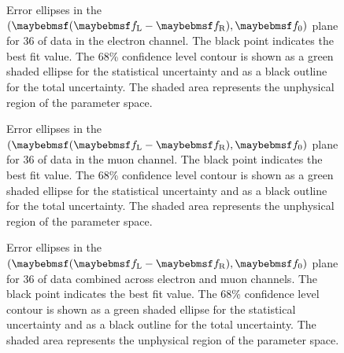 \begin{figure}[h!]
\centering
{}\quad
{}
\caption[Error ellipses in the $(\fLmfR, \f0)$ plane for \unit{36}{\invpb} of
data in the electron channel]{Error ellipses in the $(\fLmfR, \f0)$ plane for
  \unit{36}{\invpb} of data in the electron channel. The black point indicates
  the best fit value. The 68\% confidence level contour is shown as a green
  shaded ellipse for the statistical uncertainty and as a black outline for the
  total uncertainty. The shaded area represents the unphysical region of the
  parameter space.}
\label{fig:wpol_contour_ele}
\end{figure}

\begin{figure}[h!]
\centering
{}\quad
{}
\caption[Error ellipses in the $(\fLmfR, \f0)$ plane for \unit{36}{\invpb} of
data in the muon channel]{Error ellipses in the $(\fLmfR, \f0)$ plane for
  \unit{36}{\invpb} of data in the muon channel. The black point indicates the
  best fit value. The 68\% confidence level contour is shown as a green shaded
  ellipse for the statistical uncertainty and as a black outline for the total
  uncertainty. The shaded area represents the unphysical region of the parameter
  space.}
\label{fig:wpol_contour_mu}
\end{figure}


\begin{figure}[h!]
\centering
{}\quad
{}
\caption[Error ellipses in the $(\fLmfR, \f0)$ plane for \unit{36}{\invpb} of
data combined across electron and muon channels]{Error ellipses in the $(\fLmfR,
  \f0)$ plane for \unit{36}{\invpb} of data combined across electron and muon
  channels. The black point indicates the best fit value. The 68\% confidence
  level contour is shown as a green shaded ellipse for the statistical
  uncertainty and as a black outline for the total uncertainty. The shaded area
  represents the unphysical region of the parameter space.}
\label{fig:wpol_contour_comb}
\end{figure}


